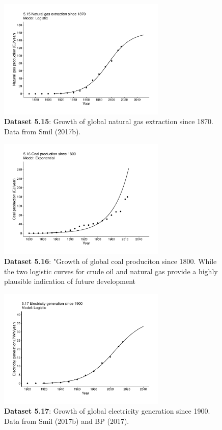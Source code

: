 \documentclass[aps,rmp,preprint,superscriptaddress,10pt,onecolumn]{article}
\begin{document}
\begin{figure}[h]
\includegraphics[width=8cm]{output/figs-ggplot/5.15.pdf}
\caption{\textbf{Dataset 5.15}: Growth of global natural gas extraction since 1870. Data from Smil (2017b).}
\end{figure}
	
\begin{figure}[h]
\includegraphics[width=8cm]{output/figs-ggplot/5.16.pdf}
\caption{\textbf{Dataset 5.16}: "Growth of global coal produciton since 1800. While the two logistic curves for crude oil and natural gas provide a highly plausible indication of future development}
\end{figure}
	
\begin{figure}[h]
\includegraphics[width=8cm]{output/figs-ggplot/5.17.pdf}
\caption{\textbf{Dataset 5.17}: Growth of global electricity generation since 1900. Data from Smil (2017b) and BP (2017). }
\end{figure}
	
\end{document}
